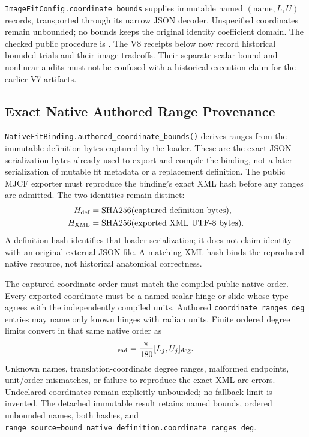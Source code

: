 \documentclass[11pt,letterpaper]{article}
\newcommand{\code}[1]{\nolinkurl{#1}}
\begin{document}
\code{ImageFitConfig.coordinate_bounds} supplies immutable named
$(\text{name},L,U)$ records, transported through its narrow JSON decoder.
Unspecified coordinates remain unbounded; no bounds keeps the original
identity coefficient domain. The checked public procedure is
.
The V8 receipts below now record historical bounded trials and their image
tradeoffs. Their separate scalar-bound and nonlinear audits must not be
confused with a historical execution claim for the earlier V7 artifacts.

\subsection{Exact Native Authored Range Provenance}
\code{NativeFitBinding.authored_coordinate_bounds()} derives ranges from the
immutable definition bytes captured by the loader. These are the exact JSON
serialization bytes already used to export and compile the binding, not a
later serialization of mutable fit metadata or a replacement definition.
The public MJCF exporter must reproduce the binding's exact XML hash before
any ranges are admitted. The two identities remain distinct:
\begin{equation}
 \begin{aligned}
 H_{\rm def}&=\mathrm{SHA256}(\text{captured definition bytes}),\\
 H_{\rm XML}&=\mathrm{SHA256}(\text{exported XML UTF-8 bytes}).
 \end{aligned}
\end{equation}
A definition hash identifies that loader serialization; it does not claim
identity with an original external JSON file. A matching XML hash binds the
reproduced native resource, not historical anatomical correctness.

The captured coordinate order must match the compiled public native order.
Every exported coordinate must be a named scalar hinge or slide whose type
agrees with the independently compiled units. Authored
\code{coordinate_ranges_deg} entries may name only known hinges with radian
units. Finite ordered degree limits convert in that same native order as
\begin{equation}
 [L_j,U_j]_{\rm rad}=\frac{\pi}{180}[L_j,U_j]_{\rm deg}.
\end{equation}
Unknown names, translation-coordinate degree ranges, malformed endpoints,
unit/order mismatches, or failure to reproduce the exact XML are errors.
Undeclared coordinates remain explicitly unbounded; no fallback limit is
invented. The detached immutable result retains named bounds, ordered
unbounded names, both hashes, and
\code{range_source=bound_native_definition.coordinate_ranges_deg}.
\end{document}
